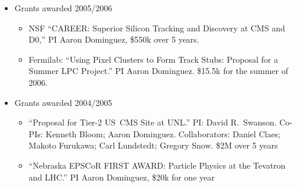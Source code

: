 \documentclass[11pt]{article}
\begin{document}
\begin{itemize}
\begin{itemize}
  \end{itemize}
\item Grants awarded 2005/2006
  \begin{itemize}
  \item NSF ``CAREER: Superior Silicon Tracking and Discovery at CMS and
    D0,'' PI Aaron Dominguez, \$550k over 5 years.
  \item Fermilab: ``Using Pixel Clusters to Form Track Stubs: Proposal for a Summer
LPC Project.'' PI Aaron Dominguez. \$15.5k for the summer of 2006.
  \end{itemize}
\item Grants awarded 2004/2005
  \begin{itemize}
  \item ``Proposal for Tier-2 US~CMS Site at UNL.'' PI: David
    R.~Swanson. Co-PIs: Kenneth Bloom; Aaron Dominguez.
    Collaborators: Daniel Claes; Makoto Furukawa; Carl Lundstedt;
    Gregory Snow.  \$2M over 5 years  
  \item ``Nebraska EPSCoR FIRST AWARD: Particle Physics at the
    Tevatron and LHC.'' PI Aaron Dominguez, \$20k for one year
  \end{itemize}
\end{itemize}


% 
\end{document}
